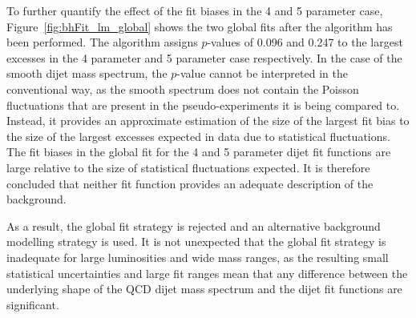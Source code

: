 To further quantify the effect of the fit biases in the 4 and 5 parameter case,
Figure~\ref{fig:bhFit_lm_global} shows the two global fits after the \bh{} algorithm has been performed.
The \bh{} algorithm assigns \mbox{$p$-values} of 0.096 and 0.247 to the largest excesses in the 4 parameter and 5 parameter case respectively.
In the case of the smooth dijet mass spectrum, the \bh{} \mbox{$p$-value} cannot be interpreted in the conventional way,
as the smooth spectrum does not contain the Poisson fluctuations that are present in the pseudo-experiments it is being compared to.
Instead, it provides an approximate estimation of the size of the largest fit bias to the size of the largest excesses expected in data due to statistical fluctuations.
The fit biases in the global fit for the 4 and 5 parameter dijet fit functions are large relative to the size of statistical fluctuations expected.
It is therefore concluded that neither fit function provides an adequate description of the background.

\newpage
As a result, the global fit strategy is rejected and an alternative background modelling strategy is used.
It is not unexpected that the global fit strategy is inadequate for large luminosities and wide mass ranges,
as the resulting small statistical uncertainties and large fit ranges mean that any
difference between the underlying shape of the QCD dijet mass spectrum
and the dijet fit functions are significant.


